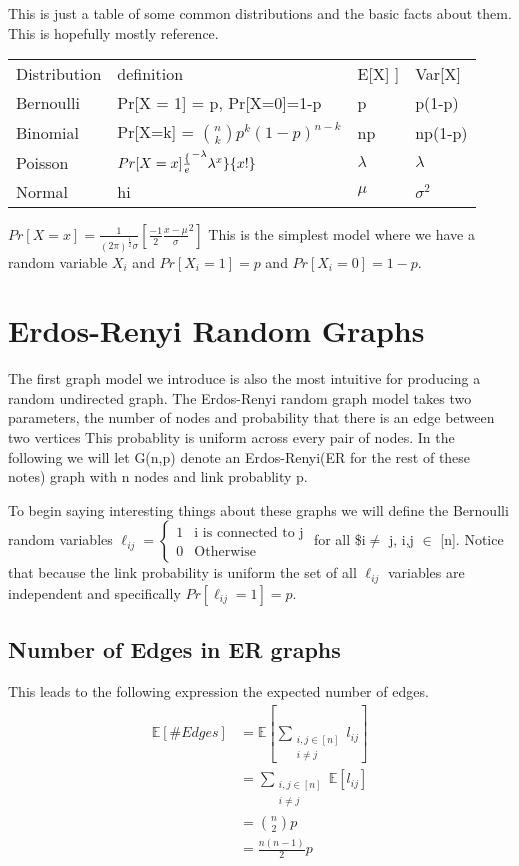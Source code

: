 \documentclass[11pt]{article}
\newcommand\ssum[1]{\sum_{\substack{#1}}}
\newcommand\E{\mathbb{E}}
\begin{document}
This is just a table of some common distributions and the basic facts about them. This is hopefully mostly reference.
\begin{center}
\begin{tabular}{llll}
Distribution & definition & E[X] ] & Var[X]\\
Bernoulli & Pr[X = 1] = p, Pr[X=0]=1-p & p & p(1-p)\\
Binomial & Pr[X=k]  = $\binom{n}{k} p^{k} (1-p)^{n-k}$ & np & np(1-p)\\
Poisson & $ Pr[X=x] \frac\{e^{- \lambda } \lambda^{x}\}\{x!\}$ &  $ \lambda $ & \(\lambda\)\\
Normal & hi &  $\mu$  & $\sigma^{2}$ \\
\end{tabular}
\end{center}
$Pr[X=x] =  \frac{1}{ (2 \pi)^{\frac{1}{2}} \sigma } \left[ \frac{-1}{2} \frac{x -\mu}{\sigma}^{2} \right]$
This is the simplest model where we have a random variable \(X_{i}\) and \(Pr[X_{i} = 1] = p\) and \(Pr[X_{i} = 0] = 1-p\).

\section{Erdos-Renyi Random Graphs}
\label{sec:org41189dd}
The first graph model we introduce is also the most intuitive for producing a random undirected graph.  The Erdos-Renyi random graph model takes two parameters, the number of nodes and probability that there is an edge between two vertices This probablity is uniform across every pair of nodes. In the following we will let G(n,p) denote an Erdos-Renyi(ER for the rest of these notes) graph with n nodes and link probablity p.


To begin saying interesting things about these graphs we will define the Bernoulli random variables \(\ell_{ij} = \begin{cases} 1 & \text{i is connected to j} \\ 0 & \text{Otherwise} \end{cases}\) for all \$i\(\neq\) j, i,j \(\in\) [n]. Notice that because the link probability is uniform the set of all \(\ell_{ij}\) variables are independent and specifically \(Pr[\ell_{ij} = 1] = p\).

\subsection{Number of Edges in ER graphs}
\label{sec:org20d0931}
This leads to the following expression the expected number of edges.
\begin{align}
    \E[\# Edges] &= \E[\sum_{\substack{i,j \in [n] \\ i\neq j}} l_{ij}  ] \\
                 &= \ssum{ i,j \in [n] \\ i\neq j } \E [l_{ij}] \\
    &= \binom{n}{2} p \\
    &= \frac{n(n-1)}{2} p
\end{align}
\end{document}
